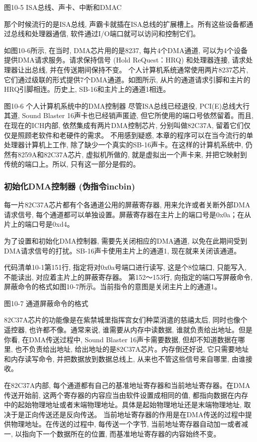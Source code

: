 \documentclass[12pt]{article}
\begin{document}
\begin{CJK}{UTF8}{gbsn}
图10-5  ISA总线、声卡、中断和DMAC

那个时候流行的是ISA总线, 声霸卡就插在ISA总线的扩展槽上。所有这些设备都通过总线和处理器通信, 软件通过I/O端口就可以访问和控制它们。

如图10-6所示, 在当时, DMA芯片用的是8237, 每片4个DMA通道, 可以为4个设备提供DMA请求服务。请求保持信号 (Hold ReQuest：HRQ) 和处理器连接, 请求处理器让出总线, 并在传送期间保持不变。
个人计算机系统通常使用两片8237芯片, 它们通过级联的形式提供7个DMA通道。如图所示, 从片的通道请求引脚和主片的HRQ引脚相连。历史上, SB-16和主片上的通道1相连。
 
图10-6  个人计算机系统中的DMA控制器
尽管ISA总线已经退役, PCI(E)总线大行其道, Sound Blaster 16声卡也已经销声匿迹, 但它所使用的端口号依然留着。而且, 在现在的ICH内部, 依然集成有两片DMA控制芯片, 分别叫做82C37A, 留着它们仅仅是照顾老软件和老硬件的需求。
不用感到疑惑, 本章的程序可以在当今流行的单处理器计算机上工作, 除了缺少一个真实的SB-16声卡。在这样的计算机系统中, 仍然有8259A和82C37A芯片, 虚拟机所做的, 就是虚拟出一个声卡来, 并把它映射到传统的端口上。所以, 只有这一部分是假的。

\subsubsection{初始化DMA控制器 (伪指令incbin) }
每一片82C37A芯片都有个各通道公用的屏蔽寄存器, 用来允许或者关断外部DMA请求信号, 每个通道都可以单独设置。屏蔽寄存器在主片上的端口号是0x0a；在从片上的端口号是0xd4。

为了设置和初始化DMA控制器, 需要先关闭相应的DMA通道, 以免在此期间受到DMA请求信号的打扰。SB-16声卡使用主片上的通道1, 现在就来关闭该通道。

代码清单10-1第151行, 指定将对0x0a号端口进行读写, 这是个8位端口, 只能写入, 不能读出, 对应着主片上的屏蔽寄存器。
第152～153行, 向指定的端口写屏蔽命令, 屏蔽命令的格式如图10-7所示。当前指令的意图是关闭主片上的通道1。
 
图10-7  通道屏蔽命令的格式

82C37A芯片的功能像是在紫禁城里指挥宫女们种菜消遣的慈禧太后, 同时也像个遥控器, 也许都不像。通常来说, 谁需要从内存中读数据, 谁就负责给出地址。但是你看, 在DMA传送过程中, Sound Blaster 16声卡需要数据, 但却不知道数据在哪里, 也不负责给出地址, 给出地址的是82C37A芯片。内存倒还好说, 它只需要地址和内存读写命令, 并把数据放到数据总线上, 从来也不管这些信号来自哪里, 由谁接收。

在82C37A内部, 每个通道都有自己的基准地址寄存器和当前地址寄存器。在DMA传送开始前, 这两个寄存器的内容应当由软件设置成相同的值, 都指向数据在内存中的起始物理地址或者末端物理地址。具体是起始物理地址还是末端物理地址, 取决于是正向传送还是反向传送。
当前地址寄存器的作用是在DMA传送的过程中提供物理地址。在传送的过程中, 每传送一个字节, 当前地址寄存器自动加一或者减一, 以指向下一个数据所在的位置, 而基准地址寄存器的内容始终不变。


\end{CJK}
\end{document}

